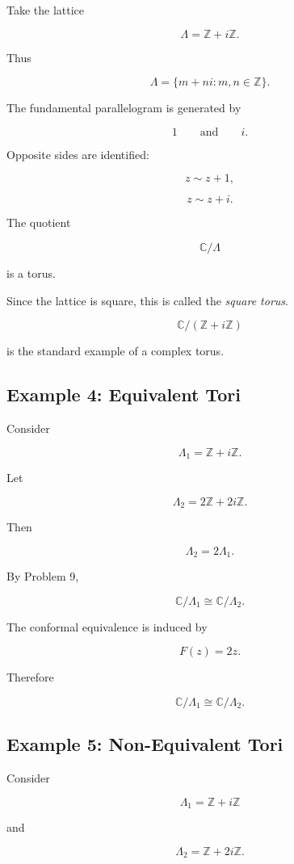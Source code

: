 \documentclass[12pt,a4paper]{article}
\theoremstyle{notespace}
\begin{document}
Take the lattice

\[
\Lambda
=
\mathbb Z+i\mathbb Z.
\]

Thus

\[
\Lambda
=
\{
m+ni
:
m,n\in\mathbb Z
\}.
\]

The fundamental parallelogram is generated by

\[
1
\qquad\text{and}\qquad
i.
\]

Opposite sides are identified:

\[
z
\sim
z+1,
\]

\[
z
\sim
z+i.
\]

The quotient

\[
\mathbb C/\Lambda
\]

is a torus.

Since the lattice is square, this is called the
\emph{square torus}.

\[
\boxed{
	\mathbb C/(\mathbb Z+i\mathbb Z)
}
\]

is the standard example of a complex torus.

\subsection{Example 4: Equivalent Tori}

Consider

\[
\Lambda_1
=
\mathbb Z+i\mathbb Z.
\]

Let

\[
\Lambda_2
=
2\mathbb Z+2i\mathbb Z.
\]

Then

\[
\Lambda_2
=
2\Lambda_1.
\]

By Problem 9,

\[
\mathbb C/\Lambda_1
\cong
\mathbb C/\Lambda_2.
\]

The conformal equivalence is induced by

\[
F(z)=2z.
\]

Therefore

\[
\boxed{
	\mathbb C/\Lambda_1
	\cong
	\mathbb C/\Lambda_2.
}
\]

\subsection{Example 5: Non-Equivalent Tori}

Consider

\[
\Lambda_1
=
\mathbb Z+i\mathbb Z
\]

and

\[
\Lambda_2
=
\mathbb Z+2i\mathbb Z.
\]
\end{document}
